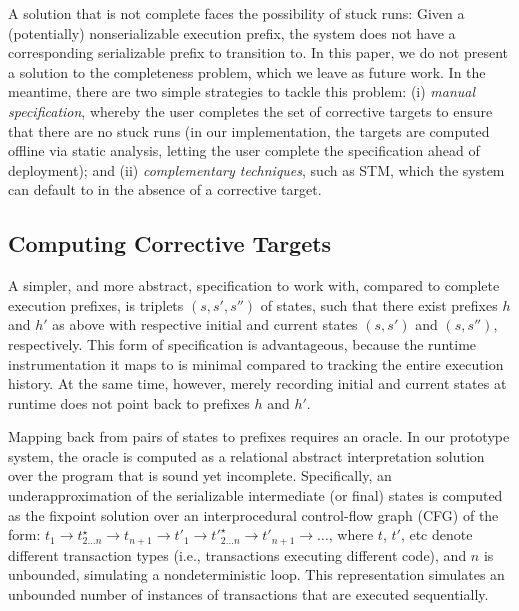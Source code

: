 A solution that is not complete faces the possibility of stuck runs: Given a (potentially) nonserializable execution prefix, the system does not have a corresponding serializable prefix to transition to. In this paper, we do not present a solution to the completeness problem, which we leave as future work. In the meantime, there are two simple strategies to tackle this problem: (i) \emph{manual specification}, whereby the user completes the set of corrective targets to ensure that there are no stuck runs (in our implementation, the targets are computed offline via static analysis, letting the user complete the specification ahead of deployment); and (ii) \emph{complementary techniques}, such as STM, which the system can default to in the absence of a corrective target.


\subsection{Computing Corrective Targets}

A simpler, and more abstract, specification to work with, compared to complete execution prefixes, is triplets $(s,s',s'')$ of states, such that there exist prefixes $h$ and $h'$ as above with respective initial and current states $(s,s')$ and $(s,s'')$, respectively. This form of specification is advantageous, because the runtime instrumentation it maps to is minimal compared to tracking the entire execution history. At the same time, however, merely recording initial and current states at runtime does not point back to prefixes $h$ and $h'$.

Mapping back from pairs of states to prefixes requires an oracle. In our prototype system, the oracle is computed as a relational abstract interpretation solution over the program that is sound yet incomplete. Specifically, an underapproximation of the serializable intermediate (or final) states is computed as the fixpoint solution over an interprocedural control-flow graph (CFG) of the form: 
	$t_1 \rightarrow t^\star_{2 \ldots n} \rightarrow t_{n+1} \rightarrow t'_1 \rightarrow t'^\star_{2 \ldots n} \rightarrow t'_{n+1} \rightarrow \ldots$,
where $t$, $t'$, etc denote different transaction types (i.e., transactions executing different code), and $n$ is unbounded, simulating a nondeterministic loop. This representation simulates an unbounded number of instances of transactions that are executed sequentially.

